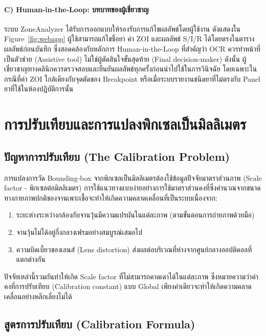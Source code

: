 \paragraph{C) Human-in-the-Loop: บทบาทของผู้เชี่ยวชาญ}
ระบบ ZoneAnalyzer ได้รับการออกแบบให้รองรับการแก้ไขผลลัพธ์โดยผู้ใช้งาน ดังแสดงใน Figure~\ref{fig:webapp} ผู้ใช้สามารถแก้ไขชื่อยา ค่า ZOI และผลลัพธ์ S/I/R ได้โดยตรงในตารางผลลัพธ์ก่อนบันทึก ซึ่งสอดคล้องกับหลักการ Human-in-the-Loop ที่สำคัญว่า OCR ควรทำหน้าที่เป็นตัวช่วย (Assistive tool) ไม่ใช่ผู้ตัดสินใจขั้นสุดท้าย (Final decision-maker) ดังนั้น ผู้เชี่ยวชาญทางคลินิกควรตรวจสอบและยืนยันผลลัพธ์ทุกครั้งก่อนนำไปใช้ในการวินิจฉัย โดยเฉพาะในกรณีที่ค่า ZOI ใกล้เคียงกับจุดตัดของ Breakpoint หรือเมื่อระบบรายงานชนิดยาที่ไม่ตรงกับ Panel ยาที่ใช้ในห้องปฏิบัติการนั้น

\section{การปรับเทียบและการแปลงพิกเซลเป็นมิลลิเมตร}
\label{sec:calibration}

\subsection{ปัญหาการปรับเทียบ (The Calibration Problem)}

การแปลงการวัด Bounding-box จากพิกเซลเป็นมิลลิเมตรต้องใช้ข้อมูลปัจจัยมาตราส่วนภาพ (Scale factor - พิกเซลต่อมิลลิเมตร)
การใช้แนวทางแบบง่ายอย่างการใช้มาตราส่วนคงที่ซึ่งคำนวณจากขนาดทางกายภาพปกติของจานเพาะเชื้อจะทำให้เกิดความคลาดเคลื่อนที่เป็นระบบเนื่องจาก:

\begin{enumerate}
  \item ระยะห่างระหว่างกล้องกับจานวุ้นมีความแปรผันในแต่ละภาพ (ตามขั้นตอนการถ่ายภาพด้วยมือ)
  \item จานวุ้นไม่ได้อยู่กึ่งกลางเฟรมอย่างสมบูรณ์เสมอไป
  \item ความบิดเบี้ยวของเลนส์ (Lens distortion) ส่งผลต่อบริเวณที่ห่างจากศูนย์กลางออปติคอลที่แตกต่างกัน
\end{enumerate}

ปัจจัยเหล่านี้รวมกันทำให้เกิด Scale factor ที่ไม่สามารถคาดเดาได้ในแต่ละภาพ ซึ่งหมายความว่าค่าคงที่การปรับเทียบ (Calibration constant) แบบ Global เพียงค่าเดียวจะทำให้เกิดความคลาดเคลื่อนอย่างหลีกเลี่ยงไม่ได้

\subsection{สูตรการปรับเทียบ (Calibration Formula)}

